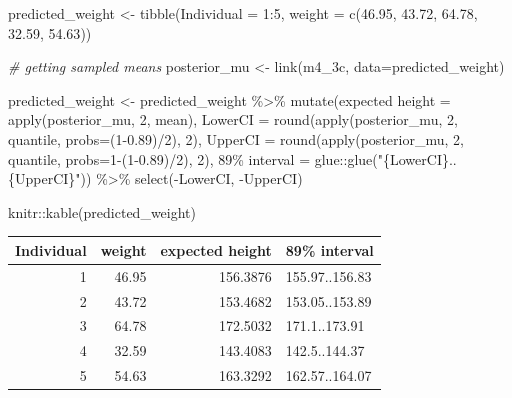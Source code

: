 \documentclass[
]{book}
\newenvironment{Shaded}{\begin{snugshade}}{\end{snugshade}}
\newcommand{\AttributeTok}[1]{\textcolor[rgb]{0.77,0.63,0.00}{#1}}
\newcommand{\CommentTok}[1]{\textcolor[rgb]{0.56,0.35,0.01}{\textit{#1}}}
\newcommand{\DecValTok}[1]{\textcolor[rgb]{0.00,0.00,0.81}{#1}}
\newcommand{\FloatTok}[1]{\textcolor[rgb]{0.00,0.00,0.81}{#1}}
\newcommand{\FunctionTok}[1]{\textcolor[rgb]{0.00,0.00,0.00}{#1}}
\newcommand{\NormalTok}[1]{#1}
\newcommand{\OtherTok}[1]{\textcolor[rgb]{0.56,0.35,0.01}{#1}}
\newcommand{\SpecialCharTok}[1]{\textcolor[rgb]{0.00,0.00,0.00}{#1}}
\newcommand{\StringTok}[1]{\textcolor[rgb]{0.31,0.60,0.02}{#1}}
\begin{document}
\begin{Shaded}
\begin{Highlighting}[]
\NormalTok{predicted\_weight }\OtherTok{\textless{}{-}} 
  \FunctionTok{tibble}\NormalTok{(}\AttributeTok{Individual =} \DecValTok{1}\SpecialCharTok{:}\DecValTok{5}\NormalTok{,}
         \AttributeTok{weight =} \FunctionTok{c}\NormalTok{(}\FloatTok{46.95}\NormalTok{, }\FloatTok{43.72}\NormalTok{, }\FloatTok{64.78}\NormalTok{, }\FloatTok{32.59}\NormalTok{, }\FloatTok{54.63}\NormalTok{))}

\CommentTok{\# getting sampled means}
\NormalTok{posterior\_mu }\OtherTok{\textless{}{-}} \FunctionTok{link}\NormalTok{(m4\_3c, }\AttributeTok{data=}\NormalTok{predicted\_weight)}

\NormalTok{predicted\_weight }\OtherTok{\textless{}{-}}\NormalTok{ predicted\_weight }\SpecialCharTok{\%\textgreater{}\%}
  \FunctionTok{mutate}\NormalTok{(}\StringTok{\textasciigrave{}}\AttributeTok{expected height}\StringTok{\textasciigrave{}} \OtherTok{=} \FunctionTok{apply}\NormalTok{(posterior\_mu, }\DecValTok{2}\NormalTok{, mean), }
         \AttributeTok{LowerCI =} \FunctionTok{round}\NormalTok{(}\FunctionTok{apply}\NormalTok{(posterior\_mu, }\DecValTok{2}\NormalTok{, quantile, }\AttributeTok{probs=}\NormalTok{(}\DecValTok{1}\FloatTok{{-}0.89}\NormalTok{)}\SpecialCharTok{/}\DecValTok{2}\NormalTok{), }\DecValTok{2}\NormalTok{),}
         \AttributeTok{UpperCI =} \FunctionTok{round}\NormalTok{(}\FunctionTok{apply}\NormalTok{(posterior\_mu, }\DecValTok{2}\NormalTok{, quantile, }\AttributeTok{probs=}\DecValTok{1}\SpecialCharTok{{-}}\NormalTok{(}\DecValTok{1}\FloatTok{{-}0.89}\NormalTok{)}\SpecialCharTok{/}\DecValTok{2}\NormalTok{), }\DecValTok{2}\NormalTok{),}
         \StringTok{\textasciigrave{}}\AttributeTok{89\% interval}\StringTok{\textasciigrave{}} \OtherTok{=}\NormalTok{ glue}\SpecialCharTok{::}\FunctionTok{glue}\NormalTok{(}\StringTok{"\{LowerCI\}..\{UpperCI\}"}\NormalTok{))  }\SpecialCharTok{\%\textgreater{}\%}
  \FunctionTok{select}\NormalTok{(}\SpecialCharTok{{-}}\NormalTok{LowerCI, }\SpecialCharTok{{-}}\NormalTok{UpperCI)}

\NormalTok{knitr}\SpecialCharTok{::}\FunctionTok{kable}\NormalTok{(predicted\_weight)}
\end{Highlighting}
\end{Shaded}

\begin{tabular}{r|r|r|l}
\hline
Individual & weight & expected height & 89\% interval\\
\hline
1 & 46.95 & 156.3876 & 155.97..156.83\\
\hline
2 & 43.72 & 153.4682 & 153.05..153.89\\
\hline
3 & 64.78 & 172.5032 & 171.1..173.91\\
\hline
4 & 32.59 & 143.4083 & 142.5..144.37\\
\hline
5 & 54.63 & 163.3292 & 162.57..164.07\\
\hline
\end{tabular}
\end{document}
